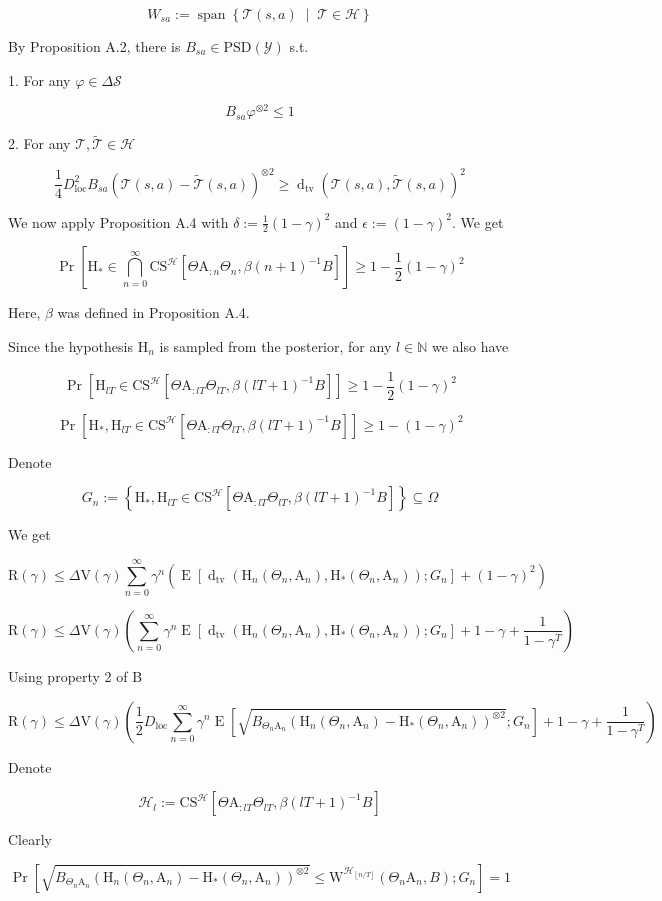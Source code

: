 \documentclass[a4paper]{article}
\DeclareMathOperator{\Sp}{span}
\newcommand{\AP}[1]{\left(#1\right)}
\newcommand{\AB}[1]{\left[#1\right]}
\newcommand{\AC}[1]{\left\{#1\right\}}
\newcommand{\ACM}[2]{\left\{#1\;\middle\vert\;#2\right\}}
\newcommand{\Pa}[2]{\underset{#1}{\operatorname{Pr}}\AB{#2}}
\newcommand{\Ea}[2]{\underset{#1}{\operatorname{E}}\AB{#2}}
\newcommand{\Dtva}[1]{\operatorname{d}_{\text{tv}}\AP{#1}}
\newcommand{\Nats}{\mathbb{N}}
\newcommand{\PSD}{\mathrm{PSD}}
\newcommand{\Floor}[1]{\left\lfloor #1 \right\rfloor}
\newcommand{\B}{B}
\newcommand{\Y}{\mathcal{Y}}
\newcommand{\St}{\mathcal{S}}
\newcommand{\T}{\mathcal{T}}
\newcommand{\Hy}{\mathcal{H}}
\newcommand{\DL}{D_{\mathrm{loc}}}
\newcommand{\V}{\mathrm{V}}
\newcommand{\Reg}{\mathrm{R}}
\newcommand{\CS}{\mathrm{CS}}
\newcommand{\W}{\mathrm{W}}
\newcommand{\AT}{\mathrm{A}}
\newcommand{\THy}{\mathrm{H}_*}
\newcommand{\SHy}{\mathrm{H}}
\newcommand{\CSE}{G}
\begin{document}
$$W_{sa}:=\Sp\ACM{\T(s,a)}{\T\in\Hy}$$

By Proposition A.2, there is $\B_{sa}\in\PSD\AP{\Y}$ s.t.

1. For any $\varphi\in\Delta\St$

$$\B_{sa}\varphi^{\otimes2}\leq1$$

2. For any $\T,\tilde{\T}\in\Hy$

$$\frac{1}{4}\DL^2 B_{sa}\AP{\T(s,a)-\tilde{\T}(s,a)}^{\otimes2} \geq \Dtva{\T(s,a),\tilde{\T}(s,a)}^2$$

We now apply Proposition A.4 with $\delta:=\frac{1}{2}(1-\gamma)^2$ and $\epsilon:=(1-\gamma)^2$. We get

$$\Pa{}{\SHy_*\in\bigcap_{n=0}^\infty\CS^\Hy\AB{\Theta\AT_{:n}\Theta_n,\beta(n+1)^{-1}\B}} \geq 1-\frac{1}{2}(1-\gamma)^2$$

Here, $\beta$ was defined in Proposition A.4.

Since the hypothesis $\SHy_n$ is sampled from the posterior, for any $l\in\Nats$ we also have

$$\Pa{}{\SHy_{lT}\in\CS^\Hy\AB{\Theta\AT_{:lT}\Theta_{lT},\beta(lT+1)^{-1}\B}} \geq 1-\frac{1}{2}(1-\gamma)^2$$

$$\Pa{}{\SHy_*,\SHy_{lT}\in\CS^\Hy\AB{\Theta\AT_{:lT}\Theta_{lT},\beta(lT+1)^{-1}\B}} \geq 1-(1-\gamma)^2$$

Denote

$$\CSE_n:=\AC{\SHy_*,\SHy_{lT}\in\CS^\Hy\AB{\Theta\AT_{:lT}\Theta_{lT},\beta(lT+1)^{-1}\B}}\subseteq\Omega$$

We get

$$\Reg(\gamma)\leq\Delta\V(\gamma)\sum_{n=0}^\infty\gamma^{n}\AP{\Ea{}{\Dtva{\SHy_n\AP{\Theta_n,\AT_n},\THy\AP{\Theta_n,\AT_n}};\CSE_n }+(1-\gamma)^2}$$

$$\Reg(\gamma)\leq\Delta\V(\gamma)\AP{\sum_{n=0}^\infty\gamma^{n}\Ea{}{\Dtva{\SHy_n\AP{\Theta_n,\AT_n},\THy\AP{\Theta_n,\AT_n}};\CSE_n }+1-\gamma+\frac{1}{1-\gamma^T}}$$

Using property 2 of B

$$\Reg(\gamma)\leq\Delta\V(\gamma)\AP{\frac{1}{2}\DL\sum_{n=0}^\infty\gamma^{n}\Ea{}{\sqrt{B_{\Theta_n\AT_n}\AP{\SHy_n\AP{\Theta_n,\AT_n}-\THy\AP{\Theta_n,\AT_n}}^{\otimes2}};\CSE_n }+1-\gamma+\frac{1}{1-\gamma^T}}$$

Denote

$$\Hy_l:=\CS^\Hy\AB{\Theta\AT_{:lT}\Theta_{lT},\beta(lT+1)^{-1}\B}$$

Clearly

$$\Pa{}{\sqrt{B_{\Theta_n\AT_n}\AP{\SHy_n\AP{\Theta_n,\AT_n}-\THy\AP{\Theta_n,\AT_n}}^{\otimes2}}\leq\W^{\Hy_{\Floor{n/T}}}\AP{\Theta_n\AT_n,B};\CSE_n}=1$$
\end{document}

